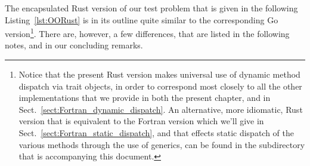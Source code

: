 \documentclass[11pt,oneside]{report}
\newcommand{\code}[1]{{\selectfont\ttfamily{#1}}}
\begin{document}
The encapsulated Rust version of our test problem that is given in the
following Listing~\ref{lst:OORust} is in its outline quite similar to
the corresponding Go version\footnote{Notice that the present Rust
version makes universal use of dynamic method dispatch via trait
objects, in order to correspond most closely to all the other
implementations that we provide in both the present chapter, and in
Sect.~\ref{sect:Fortran_dynamic_dispatch}. An alternative, more
idiomatic, Rust version that is equivalent to the Fortran version
which we'll give in Sect.~\ref{sect:Fortran_static_dispatch}, and that
effects static dispatch of the various \code{sum} methods through the
use of generics, can be found in the \code{Code} subdirectory that is
accompanying this document.}. There are, however, a few differences,
that are listed in the following notes, and in our concluding remarks.
\end{document}
